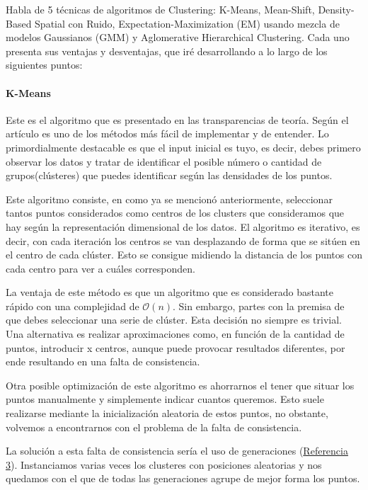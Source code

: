 \documentclass[conference,a4paper]{IEEEtran}
\begin{document}
Habla de 5 técnicas de algoritmos de Clustering: K-Means, Mean-Shift, Density-Based Spatial con Ruido, Expectation-Maximization (EM) usando mezcla de modelos Gaussianos (GMM) y Aglomerative Hierarchical Clustering. Cada uno presenta sus ventajas y desventajas, que iré desarrollando a lo largo de los siguientes puntos:\\

\paragraph{\textbf{K-Means}}

Este es el algoritmo que es presentado en las transparencias de teoría. Según el artículo es uno de los métodos más fácil de implementar y de entender. Lo primordialmente destacable es que el input inicial es tuyo, es decir, debes primero observar los datos y tratar de identificar el posible número o cantidad de grupos(clústeres) que puedes identificar según las densidades de los puntos.

Este algoritmo consiste, en como ya se mencionó anteriormente, seleccionar tantos puntos considerados como centros de los clusters que consideramos que hay según la representación dimensional de los datos. El algoritmo es iterativo, es decir, con cada iteración los centros se van desplazando de forma que se sitúen en el centro de cada clúster. Esto se consigue midiendo la distancia de los puntos con cada centro para ver a cuáles corresponden.

La ventaja de este método es que un algoritmo que es considerado bastante rápido con una complejidad de $\mathcal{O}(n)$. Sin embargo, partes con la premisa de que debes seleccionar una serie de clúster. Esta decisión no siempre es trivial. Una alternativa es realizar aproximaciones como, en función de la cantidad de puntos, introducir x centros, aunque puede provocar resultados diferentes, por ende resultando en una falta de consistencia.

Otra posible optimización de este algoritmo es ahorrarnos el tener que situar los puntos manualmente y simplemente indicar cuantos queremos. Esto suele realizarse mediante la inicialización aleatoria de estos puntos, no obstante, volvemos a encontrarnos con el problema de la falta de consistencia.

La solución a esta falta de consistencia sería el uso de generaciones (\hyperref[bib:clustering]{Referencia 3}). Instanciamos varias veces los clusteres con posiciones aleatorias y nos quedamos con el que de todas las generaciones agrupe de mejor forma los puntos.
\end{document}
